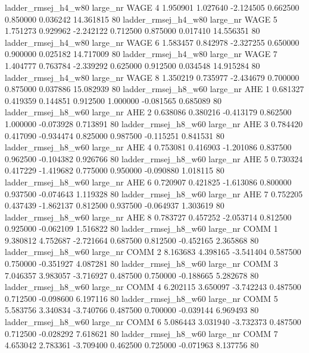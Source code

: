 ladder_rmsej_h4_w80   large_nr     WAGE                 4  1.950901  1.027640  -2.124505 0.662500 0.850000  0.036242   14.361815 80
ladder_rmsej_h4_w80   large_nr     WAGE                 5  1.751273  0.929962  -2.242122 0.712500 0.875000  0.017410   14.556351 80
ladder_rmsej_h4_w80   large_nr     WAGE                 6  1.583457  0.842978  -2.327255 0.650000 0.900000  0.025182   14.717009 80
ladder_rmsej_h4_w80   large_nr     WAGE                 7  1.404777  0.763784  -2.339292 0.625000 0.912500  0.034548   14.915284 80
ladder_rmsej_h4_w80   large_nr     WAGE                 8  1.350219  0.735977  -2.434679 0.700000 0.875000  0.037886   15.082939 80
ladder_rmsej_h8_w60   large_nr      AHE                 1  0.681327  0.419359   0.144851 0.912500 1.000000 -0.081565    0.685089 80
ladder_rmsej_h8_w60   large_nr      AHE                 2  0.638086  0.380216  -0.413179 0.862500 1.000000 -0.073928    0.713891 80
ladder_rmsej_h8_w60   large_nr      AHE                 3  0.784420  0.417090  -0.934474 0.825000 0.987500 -0.115251    0.841531 80
ladder_rmsej_h8_w60   large_nr      AHE                 4  0.753081  0.416903  -1.201086 0.837500 0.962500 -0.104382    0.926766 80
ladder_rmsej_h8_w60   large_nr      AHE                 5  0.730324  0.417229  -1.419682 0.775000 0.950000 -0.090880    1.018115 80
ladder_rmsej_h8_w60   large_nr      AHE                 6  0.720907  0.421825  -1.613086 0.800000 0.937500 -0.074643    1.119328 80
ladder_rmsej_h8_w60   large_nr      AHE                 7  0.752205  0.437439  -1.862137 0.812500 0.937500 -0.064937    1.303619 80
ladder_rmsej_h8_w60   large_nr      AHE                 8  0.783727  0.457252  -2.053714 0.812500 0.925000 -0.062109    1.516822 80
ladder_rmsej_h8_w60   large_nr     COMM                 1  9.380812  4.752687  -2.721664 0.687500 0.812500 -0.452165    2.365868 80
ladder_rmsej_h8_w60   large_nr     COMM                 2  8.163683  4.398165  -3.541404 0.587500 0.750000 -0.351927    4.087281 80
ladder_rmsej_h8_w60   large_nr     COMM                 3  7.046357  3.983057  -3.716927 0.487500 0.750000 -0.188665    5.282678 80
ladder_rmsej_h8_w60   large_nr     COMM                 4  6.202115  3.650097  -3.742243 0.487500 0.712500 -0.098600    6.197116 80
ladder_rmsej_h8_w60   large_nr     COMM                 5  5.583756  3.340834  -3.740766 0.487500 0.700000 -0.039144    6.969493 80
ladder_rmsej_h8_w60   large_nr     COMM                 6  5.086443  3.031940  -3.732373 0.487500 0.712500 -0.028292    7.618621 80
ladder_rmsej_h8_w60   large_nr     COMM                 7  4.653042  2.783361  -3.709400 0.462500 0.725000 -0.071963    8.137756 80
